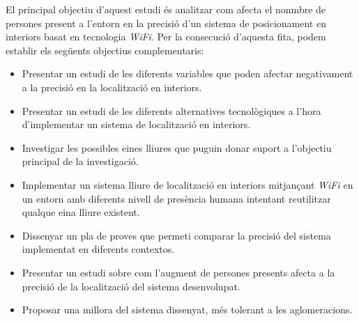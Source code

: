 
El principal objectiu d'aquest estudi és analitzar com afecta el nonmbre de persones present a l'entorn en la precisió d'un sistema de posicionament en interiors basat en tecnologia \textit{WiFi}. Per la consecució d'aquesta fita, podem establir els següents objectius complementaris:

\begin{itemize}
    \item Presentar un estudi de les diferents variables que poden afectar negativament a la precisió en la localització en interiors.
    \item Presentar un estudi de les diferents alternatives tecnològiques a l'hora d'implementar un sistema de localització en interiors.
    \item Investigar les possibles eines lliures que puguin donar suport a l'objectiu principal de la investigació.
    \item Implementar un sistema lliure de localització en interiors mitjançant \textit{WiFi} en un entorn amb diferents nivell de presència humana intentant reutilitzar qualque eina lliure existent.
    \item Dissenyar un pla de proves que permeti comparar la precisió del sistema implementat en diferents contextos.
    \item Presentar un estudi sobre com l’augment de persones presents afecta a la precisió de la localització del sistema desenvolupat.
    \item Proposar una millora del sistema dissenyat, més tolerant a les aglomeracions.
\end{itemize}
